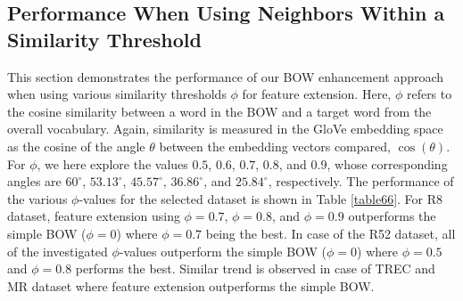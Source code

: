 \documentclass[11pt]{article}
\begin{document}
\begin{comment}

\begin{figure}[h]
    \centering
    \texttt{[image: Figures/R8.pdf]}
    \caption{Epoch-wise test accuracy based on various $k$-values for R8.}
    \label{fig6}
\end{figure}

\begin{figure}[h]
    \centering
    
    \texttt{[image: Figures/R52.pdf]}
    \caption{Epoch-wise test accuracy based on various $k$-values for R52.}
    \label{fig7}
\end{figure}

\begin{figure}[h]
    \centering
    \texttt{[image: Figures/trec.pdf]}
    \caption{Epoch-wise test accuracy based on various $k$-values for TREC.}
    \label{fig8}
\end{figure}

\begin{figure}[h]
    \centering
    \texttt{[image: Figures/MR.pdf]}
    \caption{Epoch-wise test accuracy based on various $k$-values for MR.}
    \label{fig9}
\end{figure}

\end{comment}

\subsection{Performance When Using Neighbors Within a Similarity Threshold}
This section demonstrates the performance of our BOW enhancement approach  when using various similarity thresholds $\phi$ for feature extension. Here, $\phi$ refers to the cosine similarity between a word in the BOW and a target word from the overall vocabulary. Again, similarity is measured in the GloVe embedding  space as  the cosine of the angle $\theta$ between the embedding vectors compared, $\cos(\theta)$. For $\phi$, we here explore the  values $0.5$, $0.6$, $0.7$, $0.8$, and $0.9$, whose corresponding angles are $60^{\circ}$, $53.13^{\circ}$, $45.57^{\circ}$, $36.86^{\circ}$, and $25.84^{\circ}$, respectively. The performance of the various $\phi$-values for the selected dataset is shown in Table \ref{table66}. For R8 dataset, feature extension using $\phi=0.7$, $\phi=0.8$, and $\phi=0.9$ outperforms the simple BOW ($\phi=0$) where $\phi=0.7$ being the best. In case of the R52 dataset, all of the investigated $\phi$-values outperform the simple BOW ($\phi=0$) where $\phi=0.5$ and $\phi=0.8$ performs the best. Similar trend is observed in case of TREC and MR dataset where feature extension outperforms the simple BOW.
\end{document}
